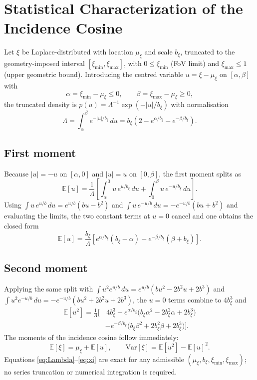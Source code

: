 \documentclass[conference]{IEEEtran}
\begin{document}
\section{Statistical Characterization of the Incidence Cosine}
\label{sec:stats}
Let $\xi$ be Laplace-distributed with location $\mu_\xi$ and scale $b_\xi$,
truncated to the geometry-imposed interval $[\xi_{\min},\xi_{\max}]$, with
$0\le\xi_{\min}$ (FoV limit) and $\xi_{\max}\le 1$ (upper geometric bound).
Introducing the centred variable $u=\xi-\mu_\xi$ on $[\alpha,\beta]$ with
\begin{equation}
\alpha=\xi_{\min}-\mu_\xi\le 0,\qquad \beta=\xi_{\max}-\mu_\xi\ge 0,
\end{equation}
the truncated density is $p(u)=\Lambda^{-1}\exp(-|u|/b_\xi)$ with
normalisation
\begin{equation}
\Lambda=\int_{\alpha}^{\beta}e^{-|u|/b_\xi}\,du
      =b_\xi\!\left(2-e^{\alpha/b_\xi}-e^{-\beta/b_\xi}\right).
\label{eq:Lambda}
\end{equation}

\subsection{First moment}
Because $|u|=-u$ on $[\alpha,0]$ and $|u|=u$ on $[0,\beta]$, the first moment
splits as
\begin{equation}
\mathbb{E}[u]=\frac{1}{\Lambda}\!\left[
\int_{\alpha}^{0}\! u\,e^{u/b_\xi}\,du
+\int_{0}^{\beta}\! u\,e^{-u/b_\xi}\,du\right].
\end{equation}
Using $\int u\,e^{u/b}\,du=e^{u/b}(bu-b^2)$ and
$\int u\,e^{-u/b}\,du=-e^{-u/b}(bu+b^2)$ and evaluating the limits, the two
constant terms at $u=0$ cancel and one obtains the closed form
\begin{equation}
\mathbb{E}[u]=\frac{b_\xi}{\Lambda}
\!\left[e^{\alpha/b_\xi}(b_\xi-\alpha)-e^{-\beta/b_\xi}(\beta+b_\xi)\right].
\label{eq:Eu}
\end{equation}

\subsection{Second moment}
Applying the same split with
$\int u^{2}e^{u/b}\,du=e^{u/b}(bu^{2}-2b^{2}u+2b^{3})$ and
$\int u^{2}e^{-u/b}\,du=-e^{-u/b}(bu^{2}+2b^{2}u+2b^{3})$, the $u=0$ terms
combine to $4b_\xi^{3}$ and
\begin{align}
\mathbb{E}[u^2]=\frac{1}{\Lambda}\Big[&\,4b_\xi^{3}
- e^{\alpha/b_\xi}\!\big(b_\xi\alpha^{2}-2b_\xi^{2}\alpha+2b_\xi^{3}\big)
\nonumber\\
&- e^{-\beta/b_\xi}\!\big(b_\xi\beta^{2}+2b_\xi^{2}\beta+2b_\xi^{3}\big)\Big].
\label{eq:Eu2}
\end{align}
The moments of the incidence cosine follow immediately:
\begin{equation}
\mathbb{E}[\xi]=\mu_\xi+\mathbb{E}[u],\qquad
\mathrm{Var}[\xi]=\mathbb{E}[u^2]-\mathbb{E}[u]^2.
\label{eq:xi}
\end{equation}
Equations \eqref{eq:Lambda}--\eqref{eq:xi} are exact for any admissible
$(\mu_\xi,b_\xi,\xi_{\min},\xi_{\max})$; no series truncation or numerical
integration is required.
\end{document}
